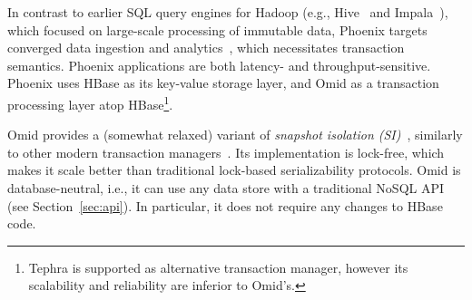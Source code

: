 In contrast to earlier SQL query engines for Hadoop (e.g., 
Hive~\cite{hive} and Impala~\cite{impala}), which focused on large-scale processing
of immutable data, Phoenix targets converged data ingestion and analytics~\cite{PhoenixUseCases},
which necessitates transaction semantics. Phoenix
applications are both latency- and throughput-sensitive. Phoenix uses HBase 
as its key-value storage layer, and Omid as a transaction processing layer atop HBase\footnote{\small{Tephra 
is supported as alternative transaction manager, however its scalability and reliability are inferior to Omid's.}}. 

Omid provides a (somewhat relaxed) variant of \emph{snapshot isolation (SI)}~\cite{DBLP:conf/sigmod/BerensonBGMOO95}, similarly to other modern transaction managers~\cite{Percolator2010,Spanner2012,tephra,cockroach}. Its implementation is lock-free, 
which makes it scale better than traditional lock-based serializability protocols.
Omid is database-neutral, i.e., it  can use any data store with a
traditional NoSQL API (see Section~\ref{sec:api}). 
In particular, it does not require any changes to HBase code.  

